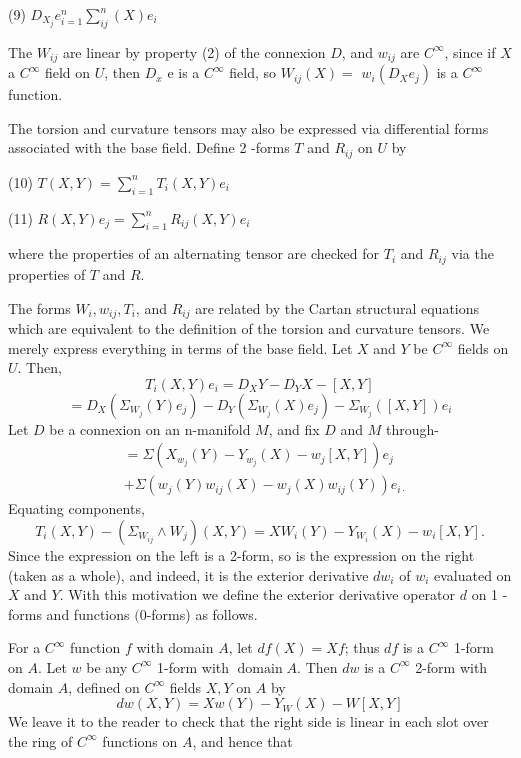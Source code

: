 \documentclass[10pt]{article}
\begin{document}
(9) $D_{X_{j}} e_{i=1}^{n} \sum_{i j}^{n}(X) e_{i}$

The $W_{i j}$ are linear by property (2) of the connexion $D$, and $w_{i j}$ are $C^{\infty}$, since if $X$ a $C^{\infty}$ field on $U$, then $D_{x}$ e is a $C^{\infty}$ field, so $W_{i j}(X)=$ $w_{i}\left(D_{X} e_{j}\right)$ is a $C^{\infty}$ function.

The torsion and curvature tensors may also be expressed via differential forms associated with the base field. Define 2 -forms $T$ and $R_{i j}$ on $U$ by

(10) $T(X, Y)=\sum_{i=1}^{n} T_{i}(X, Y) e_{i}$

(11) $R(X, Y) e_{j}=\sum_{i=1}^{n} R_{i j}(X, Y) e_{i}$

where the properties of an alternating tensor are checked for $T_{i}$ and $R_{i j}$ via the properties of $T$ and $R$.

The forms $W_{i}, w_{i j}, T_{i}$, and $R_{i j}$ are related by the Cartan structural equations which are equivalent to the definition of the torsion and curvature tensors. We merely express everything in terms of the base field. Let $X$ and $Y$ be $C^{\infty}$ fields on $U$. Then,
$$
T_{i}(X, Y) e_{i}=D_{X} Y-D_{Y} X-[X, Y]
$$
$$
=D_{X}\left(\Sigma_{W_{j}}(Y) e_{j}\right)-D_{Y}\left(\Sigma_{W_{j}}(X) e_{j}\right)-\Sigma_{W_{j}}([X, Y]) e_{i}
$$
Let $D$ be a connexion on an n-manifold $M$, and fix $D$ and $M$ through-
$$
\begin{aligned}
&=\Sigma\left(X_{w_{j}}(Y)-Y_{w_{j}}(X)-w_{j}[X, Y]\right) e_{j} \\
&+\Sigma\left(w_{j}(Y) w_{i j}(X)-w_{j}(X) w_{i j}(Y)\right) e_{i \cdot}
\end{aligned}
$$
Equating components,
$$
T_{i}(X, Y)-\left(\Sigma_{W_{i j}} \wedge W_{j}\right)(X, Y)=X W_{i}(Y)-Y_{W_{i}}(X)-w_{i}[X, Y] .
$$
Since the expression on the left is a 2-form, so is the expression on the right (taken as a whole), and indeed, it is the exterior derivative $d w_{i}$ of $w_{i}$ evaluated on $X$ and $Y$. With this motivation we define the exterior derivative operator $d$ on 1 -forms and functions $(0$-forms) as follows.

For a $C^{\infty}$ function $f$ with domain $A$, let $d f(X)=X f$; thus $d f$ is a $C^{\infty}$ 1-form on $A$. Let $w$ be any $C^{\infty}$ 1-form with $\operatorname{domain} A$. Then $d w$ is a $C^{\infty}$ 2-form with domain $A$, defined on $C^{\infty}$ fields $X, Y$ on $A$ by
$$
d w(X, Y)=X w(Y)-Y_{W}(X)-W[X, Y]
$$
We leave it to the reader to check that the right side is linear in each slot over the ring of $C^{\infty}$ functions on $A$, and hence that
\end{document}
